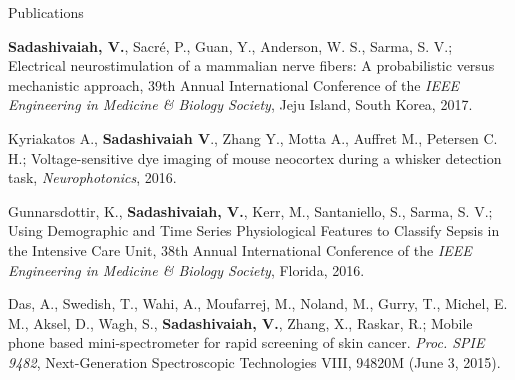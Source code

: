 \documentclass{resume}
\begin{document}
\begin{rSection}{Publications}
\begin{publications}
\item \textbf{Sadashivaiah, V.}, Sacré, P., Guan, Y., Anderson, W. S., Sarma, S. V.; Electrical neurostimulation of a mammalian nerve fibers: A probabilistic versus mechanistic approach, 39th Annual International Conference of the \textit{IEEE Engineering in Medicine \& Biology Society}, Jeju Island, South Korea, 2017.

\item Kyriakatos A., \textbf{Sadashivaiah V}., Zhang Y., Motta A., Auffret M., Petersen C. H.; Voltage-sensitive dye imaging of mouse neocortex during a whisker detection task, \textit{Neurophotonics}, 2016.

\item Gunnarsdottir, K., \textbf{Sadashivaiah, V.}, Kerr, M., Santaniello, S., Sarma, S. V.; Using Demographic and Time Series Physiological Features to Classify Sepsis in the Intensive Care Unit, 38th Annual International Conference of the \textit{IEEE Engineering in Medicine \& Biology Society}, Florida, 2016.

\item Das, A., Swedish, T., Wahi, A., Moufarrej, M., Noland, M., Gurry, T., Michel, E. M., Aksel, D., Wagh, S., \textbf{Sadashivaiah, V.}, Zhang, X., Raskar, R.; Mobile phone based mini-spectrometer for rapid screening of skin cancer. \textit{Proc. SPIE 9482}, Next-Generation Spectroscopic Technologies VIII, 94820M (June 3, 2015).

\end{publications}
\end{rSection} 
\end{document}
